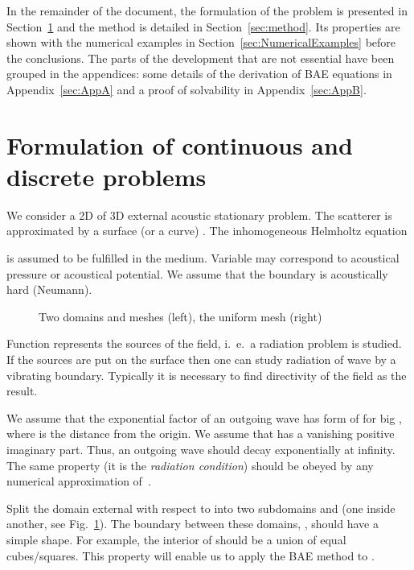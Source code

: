\documentclass[12pt]{article}
\newcommand{\fref}[1]{Fig.~\ref{#1}}
\newcommand{\sref}[1]{Section~\ref{#1}}
\newcommand{\aref}[1]{Appendix~\ref{#1}}
\begin{document}
In the remainder of the document, the formulation of the problem  is presented in \sref{sec:formulation} and the method is detailed in \sref{sec:method}. Its properties are shown with the numerical examples in \sref{sec:NumericalExamples} before the conclusions. The parts of the development that are not essential have been grouped in the appendices: some details of the derivation of BAE equations in \aref{sec:AppA} and a proof of solvability in \aref{sec:AppB}.





\section{Formulation of continuous and discrete problems}
\label{sec:formulation}

We consider a 2D of 3D external acoustic stationary problem. The scatterer is approximated by a surface (or a curve)
.
The inhomogeneous Helmholtz equation

is assumed to be fulfilled in the medium. Variable  may correspond to acoustical pressure or acoustical potential.
We assume that the boundary is acoustically hard (Neumann).



\begin{figure}[ht]
\centerline{}
\caption{Two domains and meshes (left), the uniform mesh (right)}
\label{fig01}
\end{figure}


Function  represents the sources of the field, i.\ e.\  a radiation problem is studied. If the sources are
put on the surface  then one can study radiation of wave by a vibrating boundary. Typically it is necessary to find directivity of the field as the result.

We assume that the exponential factor of an outgoing wave has form of  for big , where  is the distance from the origin.
We assume that  has a vanishing positive imaginary part. Thus, an outgoing wave should decay
exponentially at infinity. The same property (it is the {\em radiation condition}) should be obeyed by
any numerical approximation of~.



Split the domain external with respect to  into two subdomains  and 
(one inside another, see \fref{fig01}). The boundary between these domains, , should have a simple shape. For example, the interior of  should be  a union of equal cubes/squares. This property will enable us to apply the BAE method to .
\end{document}
